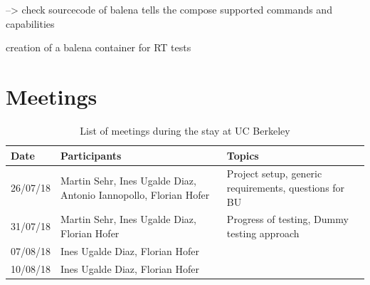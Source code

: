 \documentclass[]{scrartcl}
\begin{document}
--> check sourcecode of balena tells the compose supported commands and capabilities

creation of a balena container for RT tests


\section{Meetings}

\begin{table}
	\centering
	\caption{List of meetings during the stay at UC Berkeley}
	
	\begin{tabular}{l l l}
	Date & Participants & Topics \\
	\hline
	26/07/18 & Martin Sehr, Ines Ugalde Diaz, Antonio Iannopollo, Florian Hofer & Project setup, generic requirements, questions for BU\\
	31/07/18 & Martin Sehr, Ines Ugalde Diaz, Florian Hofer & Progress of testing, Dummy testing approach\\
	07/08/18 & Ines Ugalde Diaz, Florian Hofer & \\
	10/08/18 & Ines Ugalde Diaz, Florian Hofer & \\
	\hline
	\end{tabular}
	
	\label{tab:meeting}
\end{table}
\end{document}
